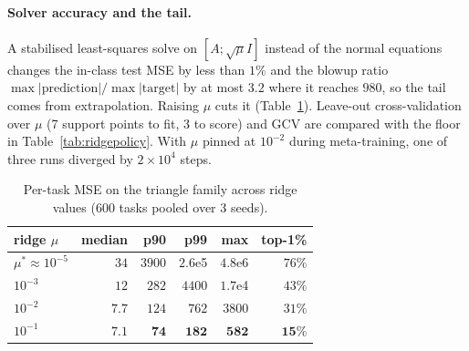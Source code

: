 \documentclass[fullpaper,final]{nldl}
\theoremstyle{plain}
\theoremstyle{definition}
\begin{document}
\paragraph{Solver accuracy and the tail.} A stabilised least-squares solve on
$[A;\sqrt{\mu}I]$ instead of the normal equations changes the in-class test MSE by
less than $1\%$ and the blowup ratio $\max|\text{prediction}|/\max|\text{target}|$
by at most $3.2$ where it reaches $980$, so the tail comes from extrapolation. Raising
$\mu$ cuts it (Table~\ref{tab:tail}). Leave-out cross-validation over $\mu$ (7
support points to fit, 3 to score) and GCV are compared with the floor in
Table~\ref{tab:ridgepolicy}. With $\mu$ pinned at $10^{-2}$ during meta-training,
one of three runs diverged by $2\!\times\!10^4$ steps.

\begin{table}[tb]
\centering
\caption{Per-task MSE on the triangle family across ridge values (600 tasks pooled
over 3 seeds).}
\label{tab:tail}
\small
\setlength{\tabcolsep}{4pt}
\begin{tabular}{lrrrrr}
\toprule
ridge $\mu$ & median & p90 & p99 & max & top-1\% \\
\midrule
$\mu^\ast\!\approx\!10^{-5}$ & $34$ & $3900$ & $2.6$e5 & $4.8$e6 & $76\%$ \\
$10^{-3}$ & $12$ & $282$ & $4400$ & $1.7$e4 & $43\%$ \\
$10^{-2}$ & $7.7$ & $124$ & $762$ & $3800$ & $31\%$ \\
$10^{-1}$ & $\mathbf{7.1}$ & $\mathbf{74}$ & $\mathbf{182}$ & $\mathbf{582}$ & $\mathbf{15\%}$ \\
\bottomrule
\end{tabular}
\end{table}
\end{document}
